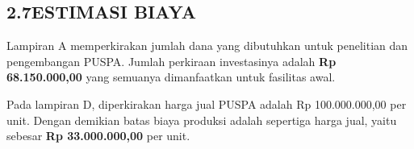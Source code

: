 \subsection*{\textsf{\normalsize 2.7\hspace{0.5cm}ESTIMASI BIAYA}}

Lampiran A memperkirakan jumlah dana yang dibutuhkan untuk penelitian dan pengembangan PUSPA. Jumlah perkiraan investasinya adalah \textbf{Rp 68.150.000,00} yang semuanya dimanfaatkan untuk fasilitas awal.

Pada lampiran D, diperkirakan harga jual PUSPA adalah Rp 100.000.000,00 per unit. Dengan demikian batas biaya produksi adalah sepertiga harga jual, yaitu sebesar \textbf{Rp 33.000.000,00} per unit.
